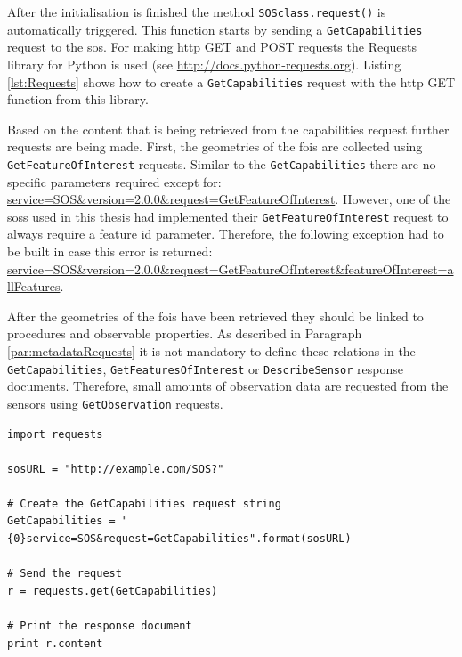 After the initialisation is finished the method \texttt{SOSclass.request()} is automatically triggered. This function starts by sending a \texttt{GetCapabilities} request to the \ac{sos}. For making \ac{http} GET and POST requests the Requests library for Python is used (see \url{http://docs.python-requests.org}). Listing \ref{lst:Requests} shows how to create a \texttt{GetCapabilities} request with the \ac{http} GET function from this library.

\begin{sloppypar}
	Based on the content that is being retrieved from the capabilities request further requests are being made. First, the geometries of the \acp{foi} are collected using \texttt{GetFeatureOfInterest} requests. Similar to the \texttt{GetCapabilities} there are no specific parameters required except for: \url{service=SOS&version=2.0.0&request=GetFeatureOfInterest}. However, one of the \aclp{sos} used in this thesis had implemented their \texttt{GetFeatureOfInterest} request to always require a feature id parameter. Therefore, the following exception had to be built in case this error is returned: \url{service=SOS&version=2.0.0&request=GetFeatureOfInterest&featureOfInterest=allFeatures}.
\end{sloppypar}

\begin{sloppypar}
After the geometries of the \acp{foi} have been retrieved they should be linked to procedures and observable properties. As described in Paragraph \ref{par:metadataRequests} it is not mandatory to define these relations in the \texttt{GetCapabilities}, \texttt{GetFeaturesOfInterest} or \texttt{DescribeSensor} response documents. Therefore, small amounts of observation data are requested from the sensors using \texttt{GetObservation} requests.  
\end{sloppypar}

\begin{lstlisting}[float,caption={Creating a HTTP Get request using Python's Request library}, label={lst:Requests}]
import requests

sosURL = "http://example.com/SOS?"

# Create the GetCapabilities request string
GetCapabilities = "{0}service=SOS&request=GetCapabilities".format(sosURL)

# Send the request
r = requests.get(GetCapabilities)

# Print the response document
print r.content

\end{lstlisting}   


